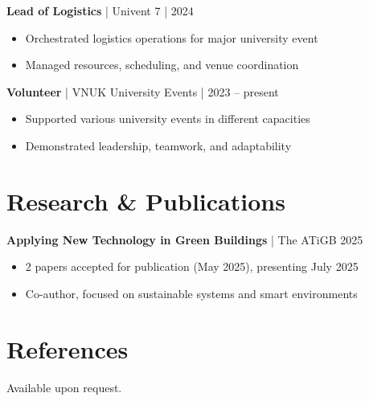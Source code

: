 \documentclass[11pt,a4paper]{article}
\begin{document}
\vspace{0.5em}
\textbf{Lead of Logistics} | Univent 7 | 2024
\begin{itemize}[leftmargin=*,nosep]
  \item Orchestrated logistics operations for major university event
  \item Managed resources, scheduling, and venue coordination
\end{itemize}

\vspace{0.5em}
\textbf{Volunteer} | VNUK University Events | 2023 – present
\begin{itemize}[leftmargin=*,nosep]
  \item Supported various university events in different capacities
  \item Demonstrated leadership, teamwork, and adaptability
\end{itemize}

\section{Research \& Publications}
\textbf{Applying New Technology in Green Buildings} | The ATiGB 2025
\begin{itemize}[leftmargin=*,nosep]
  \item 2 papers accepted for publication (May 2025), presenting July 2025
  \item Co-author, focused on sustainable systems and smart environments
\end{itemize}

\section{References}
Available upon request.
\end{document}
